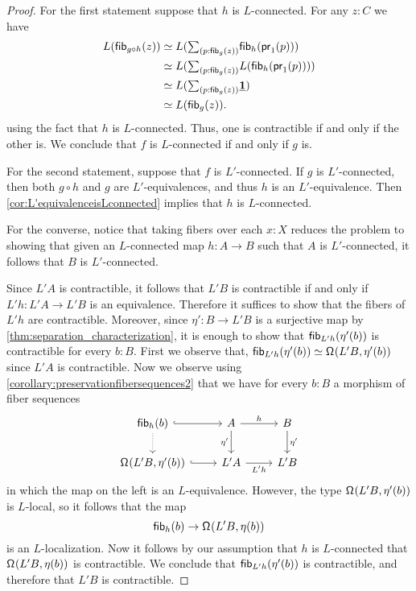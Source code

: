 \begin{proof}
For the first statement suppose that $h$ is $L$-connected.
  For any $z:C$ we have
  \begin{align*}
    L(\fib{g\circ h}{z})
    & \eqvsym
      L(\sm{p:\fib{g}{z}}\fib{h}{\proj1(p)}) \\
    & \eqvsym
      L(\sm{p:\fib{g}{z}}L(\fib{h}{\proj1(p)})) \\
    & \eqvsym
      L(\sm{p:\fib{g}{z}}\unit) \\
    & \eqvsym
      L(\fib{g}{z}).
  \end{align*}
  using the fact that $h$ is $L$-connected.
  Thus, one is contractible if and only if the other is. We conclude that $f$ is $L$-connected if and only if $g$ is.

For the second statement, suppose that $f$ is $L'$-connected.
    If $g$ is $L'$-connected, then both $g\circ h$ and $g$ are $L'$-equivalences,
    and thus $h$ is an $L'$-equivalence. Then \cref{cor:L'equivalenceisLconnected}
    implies that $h$ is $L$-connected.

    For the converse, notice that taking fibers over each $x:X$ reduces the problem
    to showing that given an $L$-connected map $h : A \to B$
    such that $A$ is $L'$-connected, it follows that $B$ is $L'$-connected. 

    Since $L'A$ is contractible, it follows that $L'B$ is contractible if and only if $L'h:L'A\to L'B$ is an equivalence.
    Therefore it suffices to show that the fibers of $L'h$ are contractible. Moreover, since $\eta':B\to L'B$ is a surjective map by \cref{thm:separation_characterization}, it is enough to show that $\mathsf{fib}_{L'h}(\eta'(b))$ is contractible for every $b:B$.
First we observe that, $\eqv{\fib{L'h}{\eta'(b)}}{\loopspace{L'B,\eta'(b)}}$ since $L'A$ is contractible. 
    Now we observe using \cref{corollary:preservationfibersequences2} that we have for every $b:B$ a morphism of fiber sequences
\begin{equation*}
\begin{tikzcd}
\fib{h}{b} \arrow[r,hookrightarrow] \arrow[d,densely dotted] & A \arrow[d,swap,"\eta'"] \arrow[r,"h"] & B \arrow[d,"\eta'"] \\
\loopspace{L'B,\eta'(b)} \arrow[r,hookrightarrow] & L'A \arrow[r,swap,"L'h"] & L'B
\end{tikzcd}
\end{equation*}
in which the map on the left is an $L$-equivalence. However, the type $\mathsf{\Omega}^{}(L'B,\eta'(b))$ is $L$-local, so it follows that the map
\begin{equation*}
\mathsf{fib}_{h}(b)\to \mathsf{\Omega}^{}(L'B,\eta(b))
\end{equation*}
is an $L$-localization. Now it follows by our assumption that $h$ is $L$-connected that $\mathsf{\Omega}^{}(L'B,\eta(b))$ is contractible. We conclude that $\mathsf{fib}_{L'h}(\eta'(b))$ is contractible, and therefore that $L'B$ is contractible.
\end{proof}

